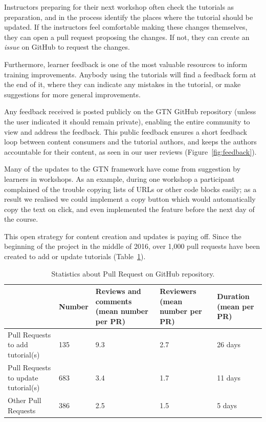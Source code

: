 \documentclass[10pt,letterpaper]{article}
\begin{document}
Instructors preparing for their next workshop often check the tutorials as preparation, and in the process identify the places where the tutorial should be updated.
If the instructors feel comfortable making these changes themselves, they can open a pull request proposing the changes.
If not, they can create an \emph{issue} on GitHub to request the changes.

Furthermore, learner feedback is one of the most valuable resources to inform training improvements.
Anybody using the tutorials will find a feedback form at the end of it, where they can indicate any mistakes in the tutorial, or make suggestions for more general improvements.

Any feedback received is posted publicly on the GTN GitHub repository (unless the user indicated it should remain private), enabling the entire community to view and address the feedback.
This public feedback ensures a short feedback loop between content consumers and the tutorial authors, and keeps the authors accountable for their content, as seen in our user reviews (Figure~\ref{fig:feedback}).


Many of the updates to the GTN framework have come from suggestion by learners in workshops.
As an example, during one workshop a participant complained of the trouble copying lists of URLs or other code blocks easily; as a result we realised we could implement a copy button which would automatically copy the text on click, and even implemented the feature before the next day of the course.


This open strategy for content creation and updates is paying off.
Since the beginning of the project in the middle of 2016, over 1,000 pull requests have been created to add or update tutorials (Table~\ref{tbl:pullRequestReviewing}).

\begin{table}[]
\begin{adjustwidth}{-2.25in}{0in} %
	\centering
	\caption{Statistics about Pull Request on GitHub repository.\label{tbl:pullRequestReviewing}}
	\begin{tabular}{l|p{}p{}p{}p{}}
									        & Number & Reviews and comments (mean number per PR) & Reviewers (mean number per PR) & Duration (mean per PR) \\\hline
		Pull Requests to add tutorial(s)    & 135    & 9.3                                       & 2.7                            & 26 days\\
		Pull Requests to update tutorial(s) & 683    & 3.4                                       & 1.7                            & 11 days\\
		Other Pull Requests                 & 386    & 2.5                                       & 1.5                            & 5 days\\
	\end{tabular}
\end{adjustwidth}
\end{table}
\end{document}
